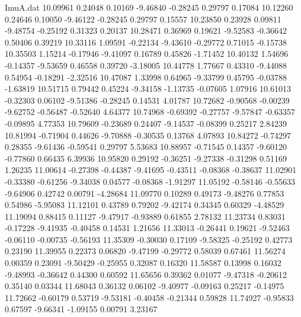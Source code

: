 \begin{filecontents}{ImuA.dat}
  10.09961    0.24048    0.10169   -9.46840   -0.28245    0.29797    0.17084
  10.12260    0.24646    0.10050   -9.46122   -0.28245    0.29797    0.15557
  10.23850    0.23928    0.09811   -9.48754   -0.25192    0.31323    0.20137
  10.28471    0.36969    0.19621   -9.52583   -0.36642    0.50406    0.39219
  10.33116    1.09591   -0.22134   -9.43610   -0.29772    0.71015   -0.15738
  10.35503    1.15214   -0.17946   -9.41097    0.16789    0.45826   -1.71452
  10.40132    1.54696   -0.14357   -9.53659    0.46558    0.39720   -3.18005
  10.44778    1.77667    0.43310   -9.44088    0.54954   -0.18291   -2.32516
  10.47087    1.33998    0.64965   -9.33799    0.45795   -0.03788   -1.63819
  10.51715    0.79442    0.45224   -9.34158   -1.13735   -0.07605    1.07916
  10.61013   -0.32303    0.06102   -9.51386   -0.28245    0.14531    4.01787
  10.72682   -0.90568   -0.00239   -9.62752   -0.56487   -0.52640    4.64377
  10.74968   -0.69392   -0.27757   -9.57847   -0.63357   -0.09895    4.77353
  10.79609   -0.23689    0.24407   -9.14537   -0.08399    0.25217    2.84239
  10.81994   -0.71904    0.44626   -9.70888   -0.30535    0.13768    4.07893
  10.84272   -0.74297    0.28355   -9.61436   -0.59541    0.29797    5.53683
  10.88957   -0.71545    0.14357   -9.60120   -0.77860    0.66435    6.39936
  10.95820    0.29192   -0.36251   -9.27338   -0.31298    0.51169    1.26235
  11.00614   -0.27398   -0.44387   -9.41695   -0.43511   -0.08368   -0.38637
  11.02901   -0.33380   -0.61256   -9.34038    0.04577   -0.08368   -1.91297
  11.05192   -0.58146   -0.55633   -9.64906    0.42742    0.00791   -4.28684
  11.09770    0.10289    0.49173   -9.48276    0.77853    0.54986   -5.95083
  11.12101    0.43789    0.79202   -9.42174    0.34345    0.60329   -4.48529
  11.19094    0.88415    0.11127   -9.47917   -0.93889    0.61855    2.78132
  11.23734    0.83031   -0.17228   -9.41935   -0.40458    0.14531    1.21656
  11.33013   -0.26441    0.19621   -9.52463   -0.06110   -0.00735   -0.56193
  11.35309   -0.30030    0.17109   -9.58325   -0.25192    0.42773    0.23190
  11.39955    0.22373    0.06820   -9.47199   -0.29772    0.58039    0.67461
  11.56274    0.00359    0.23091   -9.50429   -0.25955    0.32087    0.16320
  11.58587    0.13998    0.16032   -9.48993   -0.36642    0.44300    0.60592
  11.65656    0.39362    0.01077   -9.47318   -0.20612    0.35140    0.03344
  11.68043    0.36132    0.06102   -9.40977   -0.09163    0.25217   -0.14975
  11.72662   -0.60179    0.53719   -9.53181   -0.40458   -0.21344    0.59828
  11.74927   -0.95833    0.67597   -9.66341   -1.09155    0.00791    3.23167

\end{filecontents}

